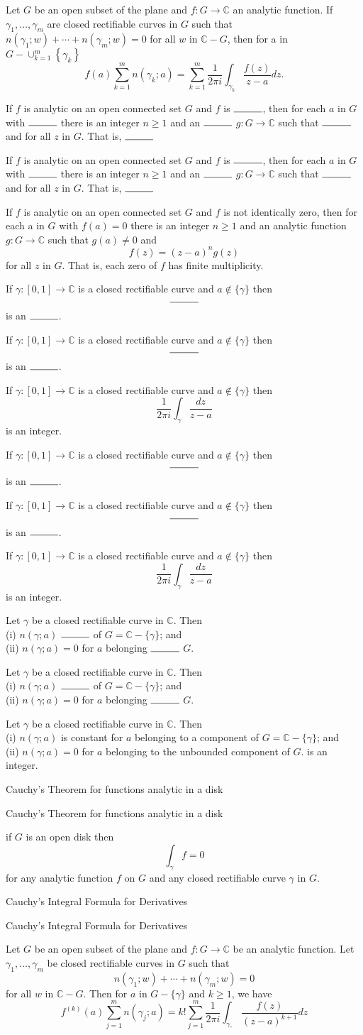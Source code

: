 \documentclass[17pt]{extarticle}
\newcommand{\boxset}[2]{\begin{mdframed}[style=darkQuesion]
#1
\end{mdframed}
\newpage
\begin{mdframed}[style=darkQuesion]
#1
  \end{mdframed}
\begin{mdframed}[style=darkAnswer]
#2
  \end{mdframed}
  \newpage
}
\begin{document}
{Let $G$ be an open subset of the plane and $f: G \rightarrow \mathbb{C}$ an analytic function. If $\gamma_{1}, \ldots, \gamma_{m}$ are closed rectifiable curves in $G$ such that $n\left(\gamma_{1} ; w\right)+\cdots+n\left(\gamma_{m} ; w\right)=0$ for all $w$ in $\mathbb{C}-G$, then for a in $G-\cup_{k=1}^{m}\left\{\gamma_{k}\right\}$ \[f(a) \sum_{k=1}^{m} n\left(\gamma_{k} ; a\right)=\sum_{k=1}^{m} \frac{1}{2 \pi i} \int_{\gamma_{k}} \frac{f(z)}{z-a} d z .\]}%
\boxset{ If $f$ is analytic on an open connected set $G$ and $f$ is $\rule{1cm}{0.15mm}$, then for each $a$ in $G$ with $\rule{1cm}{0.15mm}$ there is an integer $n \geq 1$ and an $\rule{1cm}{0.15mm}$ $g: G \rightarrow \mathbb{C}$ such that $\rule{1cm}{0.15mm}$ and for all $z$ in $G$. That is, $\rule{1cm}{0.15mm}$  }
{ If $f$ is analytic on an open connected set $G$ and $f$ is not identically zero, then for each a in $G$ with $f(a)=0$ there is an integer $n \geq 1$ and an analytic function $g: G \rightarrow \mathbb{C}$ such that $g(a) \neq 0$ and \[f(z)=(z-a)^{n} g(z)\] for all $z$ in $G$. That is, each zero of $f$ has finite multiplicity.}%
\boxset{ If $\gamma:[0,1] \rightarrow \mathbb{C}$ is a closed rectifiable curve and $a \notin\{\gamma\}$ then \[\rule{1cm}{0.15mm}\] is an $\rule{1cm}{0.15mm}$.}
{ If $\gamma:[0,1] \rightarrow \mathbb{C}$ is a closed rectifiable curve and $a \notin\{\gamma\}$ then \[\frac{1}{2 \pi i} \int_{\gamma} \frac{d z}{z-a}\] is an integer.}%
\boxset{ If $\gamma:[0,1] \rightarrow \mathbb{C}$ is a closed rectifiable curve and $a \notin\{\gamma\}$ then \[\rule{1cm}{0.15mm}\] is an $\rule{1cm}{0.15mm}$.}
{ If $\gamma:[0,1] \rightarrow \mathbb{C}$ is a closed rectifiable curve and $a \notin\{\gamma\}$ then \[\frac{1}{2 \pi i} \int_{\gamma} \frac{d z}{z-a}\] is an integer.}%
\boxset{  Let $\gamma$ be a closed rectifiable curve in $\mathbb{C}$. Then\[\ \] (i) $n(\gamma ; a)$ $\rule{1cm}{0.15mm}$ of $G=\mathbb{C}-\{\gamma\}$; and\[\ \] (ii) $n(\gamma ; a)=0$ for $a$ belonging $\rule{1cm}{0.15mm}$ $G$. }
{ Let $\gamma$ be a closed rectifiable curve in $\mathbb{C}$. Then\[\ \] (i) $n(\gamma ; a)$ is constant for $a$ belonging to a component of $G=\mathbb{C}-\{\gamma\}$; and\[\ \] (ii) $n(\gamma ; a)=0$ for $a$ belonging to the unbounded component of $G$. is an integer.}%
\boxset{Cauchy's Theorem for functions analytic in a disk }
{if $G$ is an open disk then \[\int_{\gamma} f=0\] for any analytic function $f$ on $G$ and any closed rectifiable curve $\gamma$ in $G$.}%
\boxset{Cauchy's Integral Formula for Derivatives }
{Let $G$ be an open subset of the plane and $f: G \rightarrow \mathbb{C}$ be an analytic function. Let $\gamma_{1}, \ldots, \gamma_{m}$ be closed rectifiable curves in $G$ such that \[n\left(\gamma_{1} ; w\right)+\cdots+n\left(\gamma_{m} ; w\right)=0\] for all $w$ in $\mathbb{C}-G$. Then for $a$ in $G-\{\gamma\}$ and $k \geq 1$, we have \[f^{(k)}(a) \sum_{j=1}^{m} n\left(\gamma_{j} ; a\right)=k ! \sum_{j=1}^{m} \frac{1}{2 \pi i} \int_{\gamma,} \frac{f(z)}{(z-a)^{k+1}} d z\]}%
\end{document}
